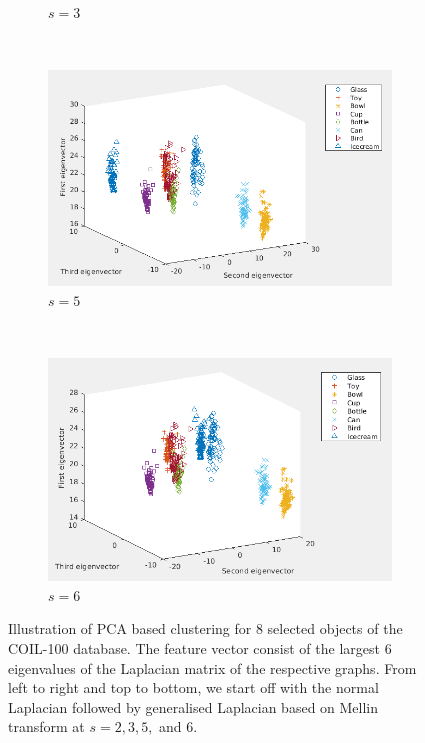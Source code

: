 \documentclass[10pt,a4paper]{article}
\begin{document}
\begin{figure}[H]
\begin{subfigure}[b]{0.45\textwidth}
		\caption{$s=3$}
		\label{}
	\end{subfigure}\\
	\begin{subfigure}[b]{0.45\textwidth}
		\includegraphics[width= \textwidth]{images/Mellin-s5.png}
		\caption{$s=5$}
		\label{}
	\end{subfigure}~
\begin{subfigure}[b]{0.45\textwidth}
	\includegraphics[width= \textwidth]{images/Mellin-s6.png}
	\caption{$s=6$}
	\label{}
\end{subfigure}
	\caption{Illustration of PCA based clustering for $8$ selected objects of the COIL-100 database. The feature vector consist of the largest $6$ eigenvalues of the Laplacian matrix of the respective graphs. From left to right and top to bottom, we start off with the normal Laplacian followed by generalised Laplacian based on Mellin transform at $s=2,3,5,$ and $6$. }
	\label{}
\end{figure}
\end{document}

